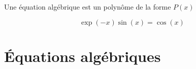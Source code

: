 Une \'equation alg\'ebrique est un polyn\^ome de la forme $P(x)$

\begin{equation}
\exp(-x)\sin(x) = \cos(x)
\end{equation}
\section{Équations algébriques}